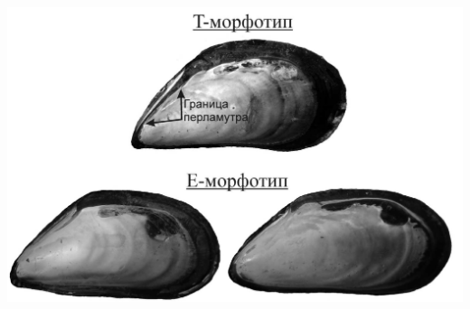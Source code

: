 \documentclass[a0,portrait]{a0poster}
\begin{document}
\begin{minipage}[t]{0.5\linewidth}
\begin{minipage}[b]{0.4\linewidth}
\end{minipage}\hspace{1cm}
%
\begin{minipage}[t]{0.5\linewidth}
	\begin{center} 
			\includegraphics[width=0.6\linewidth]{Morphotypes1.jpg}
			\label{Figmorph}
		\end{center}\vspace{0.5cm}
\end{minipage}


\end{minipage}
%
\end{document}
